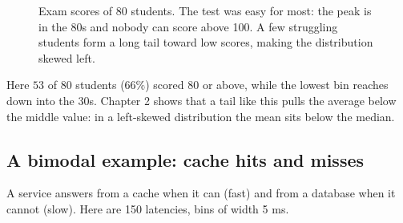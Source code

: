 \begin{figure}[H]
\centering
{}
\caption{Exam scores of 80 students. The test was easy for most: the peak is in the 80s and
nobody can score above 100. A few struggling students form a long tail toward low scores,
making the distribution skewed left.}
\label{fig:data-exam}
\end{figure}

Here $53$ of $80$ students ($66\%$) scored 80 or above, while the lowest bin reaches down into
the 30s. Chapter 2 shows that a tail like this pulls the average below the middle value: in a
left-skewed distribution the mean sits below the median.

\subsection{A bimodal example: cache hits and misses}

A service answers from a cache when it can (fast) and from a database when it cannot (slow).
Here are 150 latencies, bins of width 5 ms.

